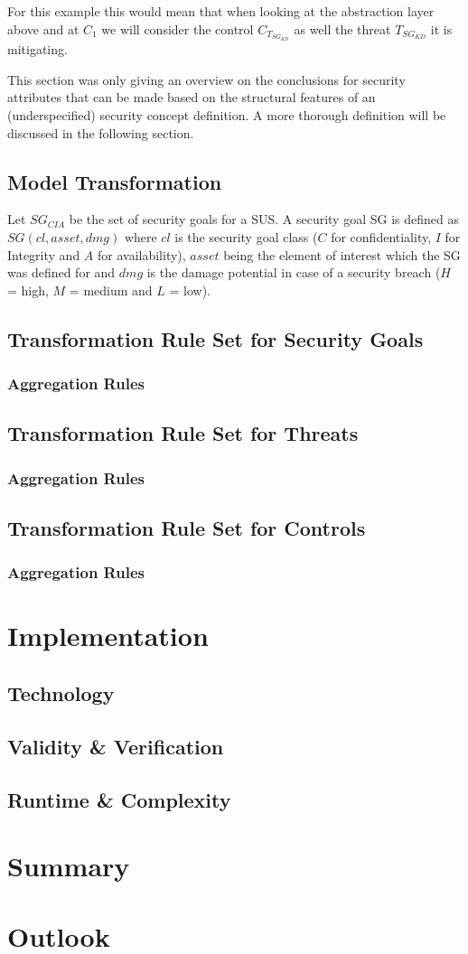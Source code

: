 For this example this would mean that when looking at the abstraction layer above and at $C_1$ we will consider the control $C_{T_{SG_{KD}}}$ as well the threat $T_{SG_{KD}}$ it is mitigating.

This section was only giving an overview on the conclusions for security attributes that can be made based on the structural features of an (underspecified) security concept definition. A more thorough definition will be discussed in the following section. 

\subsection{Model Transformation}

Let $SG_{CIA}$ be the set of security goals for a SUS. A security goal SG is defined as $SG(cl, asset, dmg)$ where $cl$ is the security goal class ($C$ for confidentiality, $I$ for Integrity and $A$ for availability), $asset$ being the element of interest which the SG was defined for and $dmg$ is the damage potential in case of a security breach ($H$ = high, $M$ = medium and $L$ = low).

\subsection{Transformation Rule Set for Security Goals}
\label{subsec:sec_goals_rules}
\subsubsection{Aggregation Rules}
\subsection{Transformation Rule Set for Threats}
\label{subsec:threat_rules}
\subsubsection{Aggregation Rules}
\subsection{Transformation Rule Set for Controls}
\subsubsection{Aggregation Rules}

\section{Implementation}
\subsection{Technology}
\subsection{Validity \& Verification}
\subsection{Runtime \& Complexity}

\section{Summary}
\section{Outlook}
\label{subsec:secgoal}